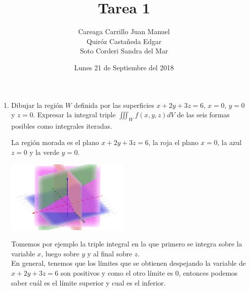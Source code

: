 \documentclass{article}
\begin{document}
    \title{Tarea 1}
    \author{Careaga Carrillo Juan Manuel \\ Quiróz Castañeda Edgar \\ Soto Corderi Sandra del Mar}
    \date{Lunes 21 de Septiembre del 2018}
    \maketitle

	\begin{enumerate}
   	\item {
        Dibujar la región $W$ definida por las superficies $x + 2y + 3z = 6$,
        $x = 0$, $y = 0$ y $z = 0$.
        Expresar la integral triple $\iiint_Wf(x,y,z)dV$ de las seis formas posibles
        como integrales iteradas.

        \color{azul}
				La región morada es el plano $x + 2y + 3z = 6$, la roja el plano
				$x = 0$, la azul $z = 0$ y la verde $y = 0$.

				\begin{center}
            \includegraphics[width=6cm]{img/ej1.png}
        \end{center}

				Tomemos por ejemplo la triple integral en la que primero se integra sobre la
				variable $x$, luego sobre $y$ y al final sobre $z$.\\
				En general, tenemos que los límites que se obtienen despejando la
				variable de $x + 2y + 3z = 6$ son positivos y como el otro límite es 0,
				entonces podemos saber cuál es el límite superior y cual es el inferior.

}
\end{enumerate}
\end{document}
